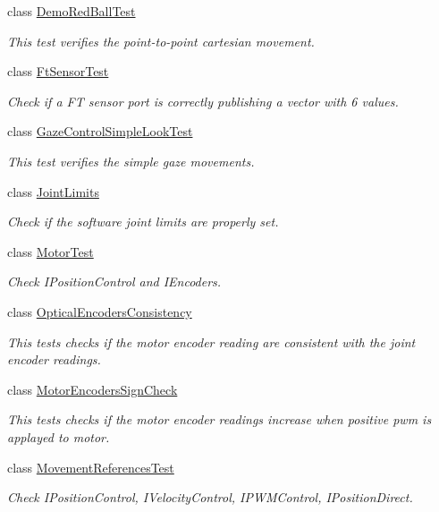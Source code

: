 \begin{DoxyCompactItemize}
class \hyperlink{classDemoRedBallTest}{Demo\+Red\+Ball\+Test}
\begin{DoxyCompactList}\small\item\em This test verifies the point-\/to-\/point cartesian movement. \end{DoxyCompactList}\item 
class \hyperlink{classFtSensorTest}{Ft\+Sensor\+Test}
\begin{DoxyCompactList}\small\item\em Check if a FT sensor port is correctly publishing a vector with 6 values. \end{DoxyCompactList}\item 
class \hyperlink{classGazeControlSimpleLookTest}{Gaze\+Control\+Simple\+Look\+Test}
\begin{DoxyCompactList}\small\item\em This test verifies the simple gaze movements. \end{DoxyCompactList}\item 
class \hyperlink{classJointLimits}{Joint\+Limits}
\begin{DoxyCompactList}\small\item\em Check if the software joint limits are properly set. \end{DoxyCompactList}\item 
class \hyperlink{classMotorTest}{Motor\+Test}
\begin{DoxyCompactList}\small\item\em Check I\+Position\+Control and I\+Encoders. \end{DoxyCompactList}\item 
class \hyperlink{classOpticalEncodersConsistency}{Optical\+Encoders\+Consistency}
\begin{DoxyCompactList}\small\item\em This tests checks if the motor encoder reading are consistent with the joint encoder readings. \end{DoxyCompactList}\item 
class \hyperlink{classMotorEncodersSignCheck}{Motor\+Encoders\+Sign\+Check}
\begin{DoxyCompactList}\small\item\em This tests checks if the motor encoder readings increase when positive pwm is applayed to motor. \end{DoxyCompactList}\item 
class \hyperlink{classMovementReferencesTest}{Movement\+References\+Test}
\begin{DoxyCompactList}\small\item\em Check I\+Position\+Control, I\+Velocity\+Control, I\+P\+W\+M\+Control, I\+Position\+Direct. \end{DoxyCompactList}\item 

\end{DoxyCompactItemize}
